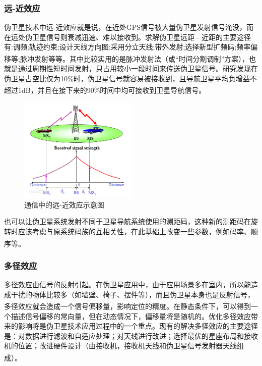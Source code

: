 \documentclass[12pt, a4paper, oneside]{ctexart}
\newcommand{\upcite}[1]{\textsuperscript{\cite{#1}}}
\begin{document}
\subsubsection{远-近效应}

伪卫星技术中远-近效应就是说，在近处GPS信号被大量伪卫星发射信号淹没，而在远处伪卫星信号则衰减迅速、难以接收到。求解伪卫星远距—近距的主要途径有:调频;轨迹约束;设计天线方向图;采用分立天线;带外发射;选择新型扩频码;频率偏移等;脉冲发射等等。\upcite{03}其中比较实用的是脉冲发射法（或“时间分割调制”方案），也就是通过周期性短时间发射，只占用较小一段时间来传送伪卫星信号。研究发现在伪卫星占空比仅为10\%时，伪卫星信号就容易被接收到，且导航卫星平均负增益不超过1dB，并且在接下来的90\%时间中均可接收到卫星导航信号。\upcite{001,002}

\begin{figure}[ht]
  \centering
  \includegraphics[width=0.50\textwidth]{img/yjxy.jpg}
  \caption{通信中的远-近效应示意图}
  \label{}
\end{figure}

也可以让伪卫星系统发射不同于卫星导航系统使用的测距码，这种新的测距码在旋转时应该考虑与原系统码族的互相关性，在此基础上改变一些参数，例如码率、顺序等。\upcite{04,001}

\subsubsection{多径效应}

多径效应由信号的反射引起。在伪卫星应用中，由于应用场景多在室内，所以能造成干扰的物体比较多（如墙壁、椅子、摆件等），而且伪卫星本身也是反射信号，多径效应就会造成一个信号偏移量，影响定位的精度。\upcite{002}在静态条件下，可以得到一个描述信号偏移的常向量，但在动态情况下，偏移量将是随机的。优化多径效应带来的影响将是伪卫星技术应用过程中的一个重点。现有的解决多径效应的主要途径是：对数据进行滤波和自适应处理；对天线进行改进；选择最优的星座布局和接收机的位置；改进硬件设计（由接收机，接收机天线和伪卫星信号发射器天线组成）。\upcite{001}
\end{document}
